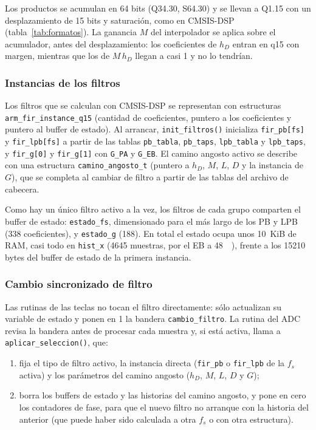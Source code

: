 \documentclass[11pt,a4paper]{article}
\begin{document}
Los productos se acumulan en 64 bits (Q34.30, S64.30) y se llevan a Q1.15
con un desplazamiento de 15 bits y saturación, como en CMSIS-DSP
(tabla~\ref{tab:formatos}). La ganancia $M$
del interpolador se aplica sobre el acumulador, antes del desplazamiento:
los coeficientes de $h_D$ entran en q15 con margen, mientras que los de
$M\,h_D$ llegan a casi 1 y no lo tendrían.

\subsubsection{Instancias de los filtros}\label{sec:instancias}

Los filtros que se calculan con CMSIS-DSP se representan con estructuras
\texttt{arm\_fir\_instance\_q15} (cantidad de coeficientes, puntero a los
coeficientes y puntero al buffer de estado). Al arrancar,
\texttt{init\_filtros()} inicializa \texttt{fir\_pb[fs]} y
\texttt{fir\_lpb[fs]} a partir de las tablas \texttt{pb\_tabla},
\texttt{pb\_taps}, \texttt{lpb\_tabla} y \texttt{lpb\_taps}, y
\texttt{fir\_g[0]} y \texttt{fir\_g[1]} con \texttt{G\_PA} y \texttt{G\_EB}.
El camino angosto activo se describe con una estructura
\texttt{camino\_angosto\_t} (puntero a $h_D$, $M$, $L$, $D$ y la instancia
de $G$), que se completa al cambiar de filtro a partir de las tablas del
archivo de cabecera.

Como hay un único filtro activo a la vez, los filtros de cada grupo
comparten el buffer de estado: \texttt{estado\_fs}, dimensionado para el más
largo de los PB y LPB (338 coeficientes), y \texttt{estado\_g} (188). En total
el estado ocupa unos 10~KiB de RAM, casi todo en \texttt{hist\_x} (\num{4645}
muestras, por el EB a \qty{48}{\kilo\sps}), frente a los \num{15210} bytes
del buffer de estado de la primera instancia.

\subsubsection{Cambio sincronizado de filtro}\label{sec:cambio-filtro}

Las rutinas de las teclas no tocan el filtro directamente: sólo actualizan
su variable de estado y ponen en 1 la bandera \texttt{cambio\_filtro}. La
rutina del ADC revisa la bandera antes de procesar cada muestra y, si está
activa, llama a \texttt{aplicar\_seleccion()}, que:

\begin{enumerate}[nosep]
  \item fija el tipo de filtro activo, la instancia directa
        (\texttt{fir\_pb} o \texttt{fir\_lpb} de la $f_s$ activa) y los
        parámetros del camino angosto ($h_D$, $M$, $L$, $D$ y $G$);
  \item borra los buffers de estado y las historias del camino angosto, y
        pone en cero los contadores de fase, para que el nuevo filtro no
        arranque con la historia del anterior (que puede haber sido
        calculada a otra $f_s$ o con otra estructura).
\end{enumerate}
\end{document}
